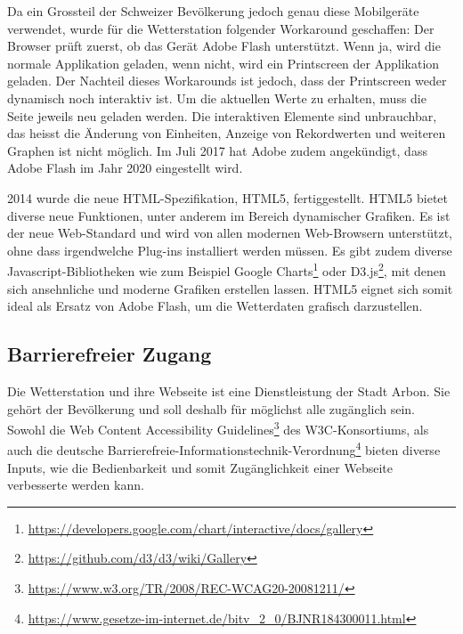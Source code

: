Da ein Grossteil der Schweizer Bevölkerung jedoch genau diese Mobilgeräte verwendet, wurde für die Wetterstation folgender Workaround geschaffen: Der Browser prüft zuerst, ob das Gerät Adobe Flash unterstützt. Wenn ja, wird die normale Applikation geladen, wenn nicht, wird ein Printscreen der Applikation geladen. Der Nachteil dieses Workarounds ist jedoch, dass der Printscreen weder dynamisch noch interaktiv ist. Um die aktuellen Werte zu erhalten, muss die Seite jeweils neu geladen werden. Die interaktiven Elemente sind unbrauchbar, das heisst die Änderung von Einheiten, Anzeige von Rekordwerten und weiteren Graphen ist nicht möglich. Im Juli 2017 hat Adobe zudem angekündigt, dass Adobe Flash im Jahr 2020 eingestellt wird\cite{Adobe:FlashTheFutureofInteractiveContent}.
\newline

\noindent
2014 wurde die neue HTML-Spezifikation, HTML5, fertiggestellt. HTML5 bietet diverse neue Funktionen, unter anderem im Bereich dynamischer Grafiken. Es ist der neue Web-Standard und wird von allen modernen Web-Browsern unterstützt, ohne dass irgendwelche Plug-ins installiert werden müssen. Es gibt zudem diverse Javascript-Bibliotheken wie zum Beispiel Google Charts\footnote{ \url{https://developers.google.com/chart/interactive/docs/gallery}} oder D3.js\footnote{ \url{https://github.com/d3/d3/wiki/Gallery}}, mit denen sich ansehnliche und moderne Grafiken erstellen lassen. HTML5 eignet sich somit ideal als Ersatz von Adobe Flash, um die Wetterdaten grafisch darzustellen. 


\subsection{Barrierefreier Zugang}
Die Wetterstation und ihre Webseite ist eine Dienstleistung der Stadt Arbon. Sie gehört der Bevölkerung und soll deshalb für möglichst alle zugänglich sein. Sowohl die \flqq Web Content Accessibility Guidelines\frqq\footnote{ \url{https://www.w3.org/TR/2008/REC-WCAG20-20081211/}} des W3C-Konsortiums, als auch die deutsche \flqq  Barrierefreie-Informationstechnik-Verordnung\frqq\footnote{ \url{https://www.gesetze-im-internet.de/bitv_2_0/BJNR184300011.html}} bieten diverse Inputs, wie die Bedienbarkeit und somit Zugänglichkeit einer Webseite verbesserte werden kann. 
\newline

